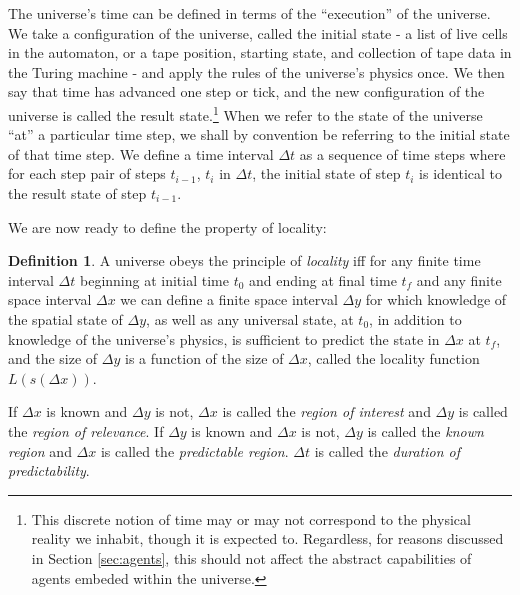 \documentclass[12pt]{article}
\theoremstyle{definition}
\newtheorem{defn}{Definition}
\begin{document}

The universe's time can be defined in terms of the ``execution'' of the
universe. We take a configuration of the universe, called the initial state - a
list of live cells in the automaton, or a tape position, starting state, and
collection of tape data in the Turing machine - and apply the rules of the
universe's physics once. We then say that time has advanced one step or tick,
and the new configuration of the universe is called the result
state.\footnote{This discrete notion of time may or may not correspond to the
physical reality we inhabit, though it is expected to. Regardless, for reasons
discussed in Section \ref{sec:agents}, this should not affect the abstract
capabilities of agents embeded within the universe.} When we refer to the state
of the universe ``at'' a particular time step, we shall by convention be
referring to the initial state of that time step. We define a time interval
\(\Delta t\) as a sequence of time steps where for each step pair of steps
\(t_{i-1}\), \(t_i\) in \(\Delta t\), the initial state of step \(t_i\) is
identical to the result state of step \(t_{i-1}\).



We are now ready to define the property of locality:

\begin{defn}

   A universe obeys the principle of \textit{locality} iff for any finite time
   interval \(\Delta t\) beginning at initial time \(t_0\) and ending at final
   time \(t_f\) and any finite space interval \(\Delta x\) we can define a
   finite space interval \(\Delta y\) for which knowledge of the spatial state
   of \(\Delta y\), as well as any universal state, at \(t_0\), in addition to
   knowledge of the universe's physics, is sufficient to predict the state in
   \(\Delta x\) at \(t_f\), and the size of \(\Delta y\) is a function of the
   size of \(\Delta x\), called the locality function \(L(s(\Delta x))\).

\end{defn}

If \(\Delta x\) is known and \(\Delta y\) is not, \(\Delta x\) is called the
\textit{region of interest} and \(\Delta y\) is called the \textit{region of
relevance}. If \(\Delta y\) is known and \(\Delta x\) is not, \(\Delta y\) is
called the \textit{known region} and \(\Delta x\) is called the
\textit{predictable region}. \(\Delta t\) is called the \textit{duration of
predictability}.
\end{document}
